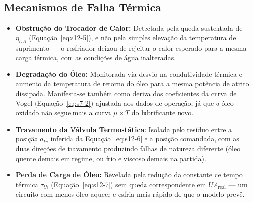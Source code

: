 \documentclass[12pt,a4paper]{article}
\numberwithin{equation}{section}
\numberwithin{table}{section}
\numberwithin{figure}{section}
\begin{document}
{	\subsection{\textbf{Mecanismos de Falha Térmica}}
	\begin{itemize}
		\item \textbf{Obstrução do Trocador de Calor:} Detectada pela queda sustentada de $\eta_{UA}$ (Equação~\eqref{eq:s12-5}), e não pela simples elevação da temperatura de suprimento — o resfriador deixou de rejeitar o calor esperado para a mesma carga térmica, com as condições de água inalteradas.
		\item \textbf{Degradação do Óleo:} Monitorada via desvio na condutividade térmica e aumento da temperatura de retorno do óleo para a mesma potência de atrito dissipada. Manifesta-se também como deriva dos coeficientes da curva de Vogel (Equação~\eqref{eq:s7-2}) ajustada aos dados de operação, já que o óleo oxidado não segue mais a curva $\mu \times T$ do lubrificante novo.
		\item \textbf{Travamento da Válvula Termostática:} Isolada pelo resíduo entre a posição $a_{tv}$ inferida da Equação~\eqref{eq:s12-6} e a posição comandada, com as duas direções de travamento produzindo falhas de natureza diferente (óleo quente demais em regime, ou frio e viscoso demais na partida).
		\item \textbf{Perda de Carga de Óleo:} Revelada pela redução da constante de tempo térmica $\tau_{th}$ (Equação~\eqref{eq:s12-7}) sem queda correspondente em $UA_{\text{real}}$ — um circuito com menos óleo aquece e esfria mais rápido do que o modelo prevê.
	\end{itemize}

}
\end{document}
